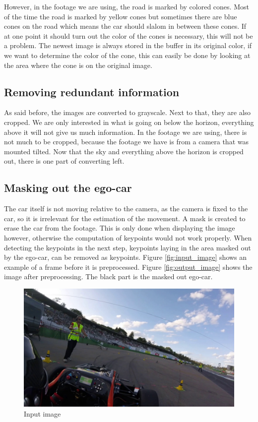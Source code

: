 However, in the footage we are using, the road is marked by colored cones. Most of the time the road is marked by yellow cones but sometimes there are blue cones on the road which means the car should slalom in between these cones. If at one point it should turn out the color of the cones is necessary, this will not be a problem. The newest image is always stored in the buffer in its original color, if we want to determine the color of the cone, this can easily be done by looking at the area where the cone is on the original image.

\subsection{Removing redundant information}\label{ssec:redundant}
As said before, the images are converted to grayscale. Next to that, they are also cropped. We are only interested in what is going on below the horizon, everything above it will not give us much information. In the footage we are using, there is not much to be cropped, because the footage we have is from a camera that was mounted tilted. Now that the sky and everything above the horizon is cropped out, there is one part of converting left.

\subsection{Masking out the ego-car}
\label{ssec:egocar}
The car itself is not moving relative to the camera, as the camera is fixed to the car, so it is irrelevant for the estimation of the movement. A mask is created to erase the car from the footage. This is only done when displaying the image however, otherwise the computation of keypoints would not work properly. When detecting the keypoints in the next step, keypoints laying in the area masked out by the ego-car, can be removed as keypoints. Figure \autoref{fig:input_image} shows an example of a frame before it is preprocessed. Figure \autoref{fig:output_image} shows the image after preprocessing. The black part is the masked out ego-car.

\begin{figure}
    \centering
    \includegraphics[width=1\textwidth]{figures/input_image.jpg}
    \caption{Input image}
    \label{fig:input_image}
\end{figure}

